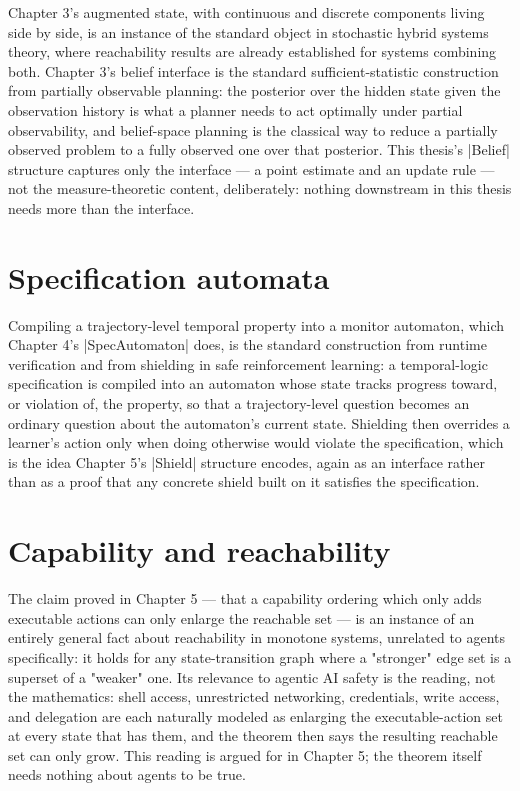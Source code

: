 \documentclass{memoir}
\begin{document}
Chapter 3's augmented state, with continuous and discrete components living
side by side, is an instance of the standard object in stochastic hybrid
systems theory, where reachability results are already established for
systems combining both. Chapter 3's belief interface is the standard
sufficient-statistic construction from partially observable planning: the
posterior over the hidden state given the observation history is what a
planner needs to act optimally under partial observability, and belief-space
planning is the classical way to reduce a partially observed problem to a
fully observed one over that posterior. This thesis's \LeanVerb|Belief| structure
captures only the interface — a point estimate and an update rule — not the
measure-theoretic content, deliberately: nothing downstream in this thesis
needs more than the interface.



\section{Specification automata}\label{Capability--Monotonicity--in--a--Formal--Skeleton--for--Agentic--AI--Safety----Related--Work----Specification--automata}

Compiling a trajectory-level temporal property into a monitor automaton,
which Chapter 4's \LeanVerb|SpecAutomaton| does, is the standard construction from
runtime verification and from shielding in safe reinforcement learning: a
temporal-logic specification is compiled into an automaton whose state
tracks progress toward, or violation of, the property, so that a
trajectory-level question becomes an ordinary question about the automaton's
current state. Shielding then overrides a learner's action only when doing
otherwise would violate the specification, which is the idea Chapter 5's
\LeanVerb|Shield| structure encodes, again as an interface rather than as a proof
that any concrete shield built on it satisfies the specification.



\section{Capability and reachability}\label{Capability--Monotonicity--in--a--Formal--Skeleton--for--Agentic--AI--Safety----Related--Work----Capability--and--reachability}

The claim proved in Chapter 5 — that a capability ordering which only adds
executable actions can only enlarge the reachable set — is an instance of an
entirely general fact about reachability in monotone systems, unrelated to
agents specifically: it holds for any state-transition graph where a
"stronger" edge set is a superset of a "weaker" one. Its relevance to
agentic AI safety is the reading, not the mathematics: shell access,
unrestricted networking, credentials, write access, and delegation are each
naturally modeled as enlarging the executable-action set at every state that
has them, and the theorem then says the resulting reachable set can only
grow. This reading is argued for in Chapter 5; the theorem itself needs
nothing about agents to be true.
\end{document}
